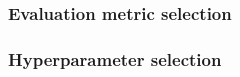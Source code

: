 \documentclass{article}
\begin{document}

\subsubsection{Evaluation metric selection}





\subsubsection{Hyperparameter selection}




\end{document}
